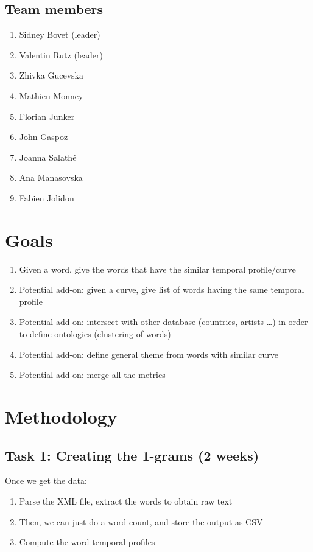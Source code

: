 \documentclass{article}
\begin{document}
\subsection{Team members}
\begin{enumerate}
\item Sidney Bovet (leader) 
\item Valentin Rutz (leader) 
\item Zhivka Gucevska 
\item Mathieu Monney 
\item Florian Junker 
\item John Gaspoz 
\item Joanna Salathé 
\item Ana Manasovska 
\item Fabien Jolidon
\end{enumerate}

\section{Goals}
\begin{enumerate}
\item Given a word, give the words that have the similar temporal profile/curve
\item Potential add-on: given a curve, give list of words having the same temporal profile
\item Potential add-on: intersect with other database (countries, artists \dots ) in order to define ontologies (clustering of words)
\item Potential add-on: define general theme from words with similar curve
\item Potential add-on: merge all the metrics
\end{enumerate}


\section{Methodology}
\subsection{Task 1: Creating the 1-grams (2 weeks)}
 Once we get the data: 
\begin{enumerate}
  \item Parse the XML file, extract the words to obtain raw text
  \item Then, we can just do a word count, and store the output as CSV
  \item Compute the word temporal profiles 
\end{enumerate}
\end{document}
